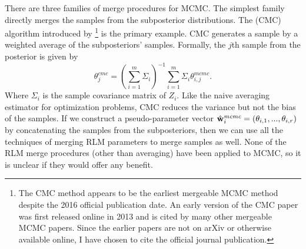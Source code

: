 \documentclass[thesis.tex]{subfiles}
\newcommand{\wmcmc}{\hat\w^\textit{mcmc}}
\newcommand\sample[2]{\theta_{{#1},{#2}}}
\begin{document}
There are three families of merge procedures for MCMC.
The simplest family directly merges the samples from the subposterior distributions.
The  (CMC) algorithm introduced by \citet{scott2016bayes}%
\footnote{
    The CMC method appears to be the earliest mergeable MCMC method despite the 2016 official publication date.
    An early version of the CMC paper was first released online in 2013 and is cited by many other mergeable MCMC papers. 
    Since the earlier papers are not on arXiv or otherwise available online,
    I have chosen to cite the official journal publication.
}
is the primary example.
CMC generates a sample by a weighted average of the subposteriors' samples.
Formally, the $j$th sample from the posterior is given by
\begin{equation}
    \theta_j^{cmc} = \left(\sum_{i=1}^m \Sigma_i\right)^{-1} \sum_{i=1}^m \Sigma_i \theta_{i,j}^{mcmc}
    .
\end{equation}
Where $\Sigma_i$ is the sample covariance matrix of $Z_i$.
Like the naive averaging estimator for optimization problems,
CMC reduces the variance but not the bias of the samples.
If we construct a pseudo-parameter vector $\wmcmc_i=(\sample{i}{1},...,\sample{i}{r})$ by concatenating the samples from the subposteriors,
then we can use all the techniques of merging RLM parameters to merge samples as well.
None of the RLM merge procedures (other than averaging) have been applied to MCMC, 
so it is unclear if they would offer any benefit.
\end{document}
